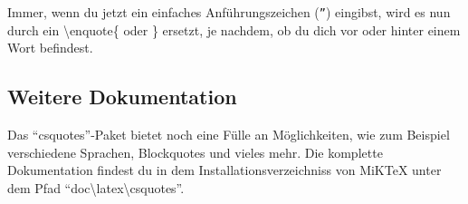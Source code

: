 Immer, wenn du jetzt ein einfaches Anführungszeichen (\texttt{''}) eingibst, wird es nun durch ein \textbackslash enquote\{ oder \} ersetzt, je nachdem, ob du dich vor oder hinter einem Wort befindest.

\subsection{Weitere Dokumentation}

Das \enquote{csquotes}-Paket bietet noch eine Fülle an Möglichkeiten, wie zum Beispiel verschiedene Sprachen, Blockquotes und vieles mehr. Die komplette Dokumentation findest du in dem Installationsverzeichniss von MiKTeX unter dem Pfad \enquote{doc\textbackslash latex\textbackslash csquotes}.

